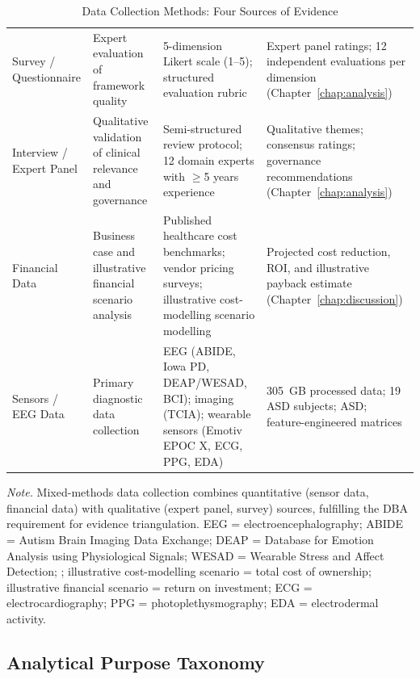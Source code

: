 {\tablestripes\tablefontsize
\begin{xltabular}{\textwidth}{@{} >{\raggedright\arraybackslash}p{2.2cm} p{3.3cm} p{4.5cm} p{4.2cm} @{}}
\caption[Data Collection Methods]{Data Collection Methods: Four Sources of Evidence}\label{tab:data_collection_methods} \\
\toprule
{} &  &  &  \\
\midrule
\endfirsthead
\endhead
\bottomrule
\endlastfoot
Survey / Questionnaire & Expert evaluation of framework quality & 5-dimension Likert scale (1--5); structured evaluation rubric & Expert panel ratings; 12 independent evaluations per dimension (Chapter~\ref{chap:analysis}) \\
\addlinespace
Interview / Expert Panel & Qualitative validation of clinical relevance and governance & Semi-structured review protocol; 12 domain experts with $\geq$5 years experience & Qualitative themes; consensus ratings; governance recommendations (Chapter~\ref{chap:analysis}) \\
\addlinespace
Financial Data & Business case and illustrative financial scenario analysis & Published healthcare cost benchmarks; vendor pricing surveys; illustrative cost-modelling scenario modelling & Projected cost reduction, ROI, and illustrative payback estimate (Chapter~\ref{chap:discussion}) \\
\addlinespace
Sensors / EEG Data & Primary diagnostic data collection & EEG (ABIDE, Iowa PD, DEAP/WESAD, BCI); imaging (TCIA); wearable sensors (Emotiv EPOC X, ECG, PPG, EDA) & 305~GB processed data; 19 ASD subjects; ASD; feature-engineered matrices \\
\end{xltabular}}
\vspace{0.5em}
\noindent\textit{Note.} Mixed-methods data collection combines quantitative (sensor data, financial data) with qualitative (expert panel, survey) sources, fulfilling the DBA requirement for evidence triangulation. EEG = electroencephalography; ABIDE = Autism Brain Imaging Data Exchange; DEAP = Database for Emotion Analysis using Physiological Signals; WESAD = Wearable Stress and Affect Detection; ;  illustrative cost-modelling scenario = total cost of ownership; illustrative financial scenario = return on investment; ECG = electrocardiography; PPG = photoplethysmography; EDA = electrodermal activity.
\fi %

\subsection{Analytical Purpose Taxonomy}

